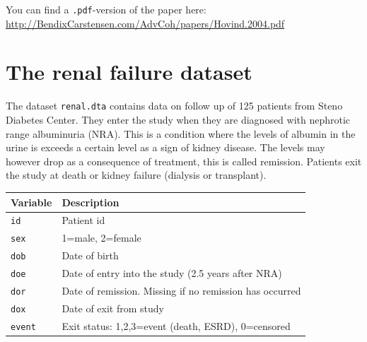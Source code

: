 \documentclass[
]{book}
\newcounter{none} %
\begin{document}
You can find a \texttt{.pdf}-version of the paper here:
\url{http://BendixCarstensen.com/AdvCoh/papers/Hovind.2004.pdf}

\section{The renal failure dataset}\label{the-renal-failure-dataset}

The dataset \texttt{renal.dta} contains data on follow up of 125
patients from Steno Diabetes Center. They enter the study when they
are diagnosed with nephrotic range albuminuria (NRA). This is a
condition where the levels of albumin in the urine is exceeds a
certain level as a sign of kidney disease. The levels may however drop
as a consequence of treatment, this is called remission. Patients exit
the study at death or kidney failure (dialysis or transplant).

{\def\LTcaptype{none} %
\begin{longtable}[]{@{}ll@{}}
\toprule\noalign{}
Variable & Description \\
\midrule\noalign{}
\endhead
\bottomrule\noalign{}
\endlastfoot
\texttt{id} & Patient id \\
\texttt{sex} & 1=male, 2=female \\
\texttt{dob} & Date of birth \\
\texttt{doe} & Date of entry into the study (2.5 years after NRA) \\
\texttt{dor} & Date of remission. Missing if no remission has occurred \\
\texttt{dox} & Date of exit from study \\
\texttt{event} & Exit status: 1,2,3=event (death, ESRD), 0=censored \\
\end{longtable}
}
\end{document}
